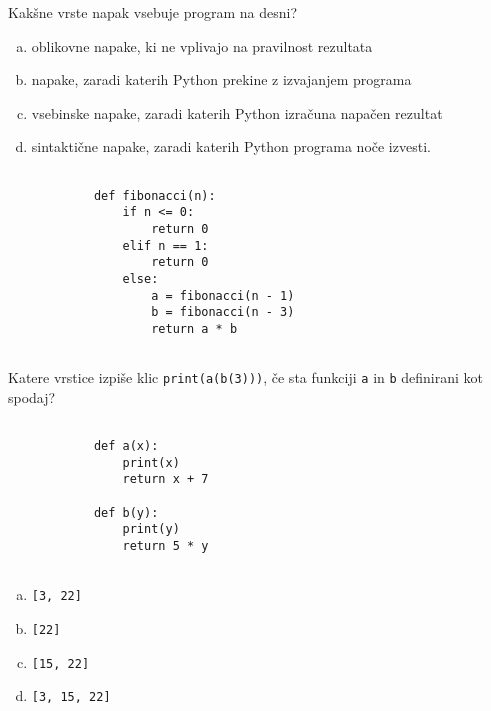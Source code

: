 \documentclass[arhiv, 10pt]{../izpit}
\newcommand{\inlinepy}[1]{\texttt{#1}}
\begin{document}
        \naloga*
        \begin{multicols}{2}
        \noindent
        Kakšne vrste napak vsebuje program na desni?

        \begin{enumerate}[(a)]
\item oblikovne napake, ki ne vplivajo na pravilnost rezultata
\item napake, zaradi katerih Python prekine z izvajanjem programa
\item vsebinske napake, zaradi katerih Python izračuna napačen rezultat
\item sintaktične napake, zaradi katerih Python programa noče izvesti.
\end{enumerate}

        \columnbreak

        \begin{verbatim}
        
            def fibonacci(n):
                if n <= 0:
                    return 0
                elif n == 1:
                    return 0
                else:
                    a = fibonacci(n - 1)
                    b = fibonacci(n - 3)
                    return a * b
            
        \end{verbatim}

        \end{multicols}

    
        \naloga*
        Katere vrstice izpiše klic \inlinepy{print(a(b(3)))}, če sta funkciji \inlinepy{a} in \inlinepy{b} definirani kot spodaj?

        \begin{multicols}{2}
        \begin{verbatim}
        
            def a(x):
                print(x)
                return x + 7

            def b(y):
                print(y)
                return 5 * y
        
        \end{verbatim}

        \begin{enumerate}[(a)]
\item \inlinepy{[3, 22]}
\item \inlinepy{[22]}
\item \inlinepy{[15, 22]}
\item \inlinepy{[3, 15, 22]}
\end{enumerate}

        \end{multicols}
    
\end{document}
